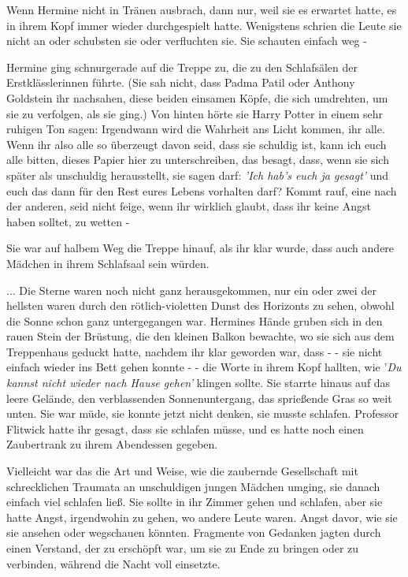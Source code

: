 Wenn Hermine nicht in Tränen ausbrach, dann nur, weil sie es erwartet hatte, es
in ihrem Kopf immer wieder durchgespielt hatte. Wenigstens schrien die Leute sie
nicht an oder schubsten sie oder verfluchten sie. Sie schauten einfach weg -

Hermine ging schnurgerade auf die Treppe zu, die zu den Schlafsälen der
Erstklässlerinnen führte. (Sie sah nicht, dass Padma Patil oder Anthony
Goldstein ihr nachsahen, diese beiden einsamen Köpfe, die sich umdrehten, um sie
zu verfolgen, als sie ging.) Von hinten hörte sie Harry Potter in einem sehr
ruhigen Ton sagen: \glqq{}Irgendwann wird die Wahrheit ans Licht kommen, ihr
alle. Wenn ihr also alle so überzeugt davon seid, dass sie schuldig ist, kann
ich euch alle bitten, dieses Papier hier zu unterschreiben, das besagt, dass,
wenn sie sich später als unschuldig herausstellt, sie sagen darf:\emph{ 'Ich
hab's euch ja gesagt'} und euch das dann für den Rest eures Lebens vorhalten
darf? Kommt rauf, eine nach der anderen, seid nicht feige, wenn ihr wirklich
glaubt, dass ihr keine Angst haben solltet, zu wetten -\grqq{}

Sie war auf halbem Weg die Treppe hinauf, als ihr klar wurde, dass auch andere
Mädchen in ihrem Schlafsaal sein würden.

... Die Sterne waren noch nicht ganz herausgekommen, nur ein oder zwei der
hellsten waren durch den rötlich-violetten Dunst des Horizonts zu sehen, obwohl
die Sonne schon ganz untergegangen war. Hermines Hände gruben sich in den rauen
Stein der Brüstung, die den kleinen Balkon bewachte, wo sie sich aus dem
Treppenhaus geduckt hatte, nachdem ihr klar geworden war, dass - - sie nicht
einfach wieder ins Bett gehen konnte - - die Worte in ihrem Kopf hallten, wie
'\emph{Du kannst nicht wieder nach Hause gehen'} klingen sollte. Sie starrte
hinaus auf das leere Gelände, den verblassenden Sonnenuntergang, das sprießende
Gras so weit unten. Sie war müde, sie konnte jetzt nicht denken, sie musste
schlafen. Professor Flitwick hatte ihr gesagt, dass sie schlafen müsse, und es
hatte noch einen Zaubertrank zu ihrem Abendessen gegeben.

Vielleicht war das die Art und Weise, wie die zaubernde Gesellschaft mit
schrecklichen Traumata an unschuldigen jungen Mädchen umging, sie danach einfach
viel schlafen ließ. Sie sollte in ihr Zimmer gehen und schlafen, aber sie hatte
Angst, irgendwohin zu gehen, wo andere Leute waren. Angst davor, wie sie sie
ansehen oder wegschauen könnten. Fragmente von Gedanken jagten durch einen
Verstand, der zu erschöpft war, um sie zu Ende zu bringen oder zu verbinden,
während die Nacht voll einsetzte.


